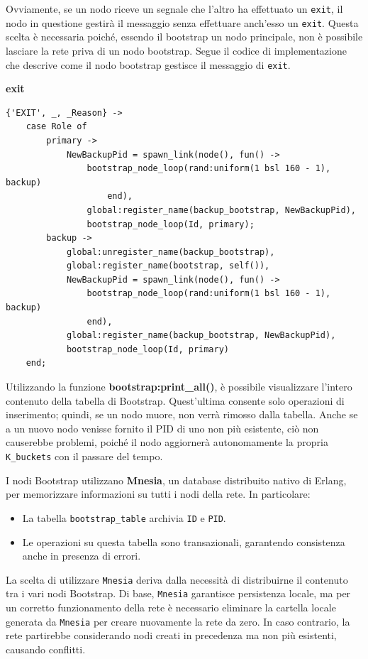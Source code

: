 \documentclass{article}
\begin{document}
Ovviamente, se un nodo riceve un segnale che l'altro ha effettuato un \texttt{exit}, il nodo in questione gestirà il messaggio senza effettuare anch'esso un \texttt{exit}. Questa scelta è necessaria poiché, essendo il bootstrap un nodo principale, non è possibile lasciare la rete priva di un nodo bootstrap. Segue il codice di implementazione che descrive come il nodo bootstrap gestisce il messaggio di \texttt{exit}.

\textbf{exit}
\begin{lstlisting}
{'EXIT', _, _Reason} ->
    case Role of
        primary ->
            NewBackupPid = spawn_link(node(), fun() ->
                bootstrap_node_loop(rand:uniform(1 bsl 160 - 1), backup)
                    end),
                global:register_name(backup_bootstrap, NewBackupPid),
                bootstrap_node_loop(Id, primary);
        backup ->
            global:unregister_name(backup_bootstrap),
            global:register_name(bootstrap, self()),
            NewBackupPid = spawn_link(node(), fun() ->
                bootstrap_node_loop(rand:uniform(1 bsl 160 - 1), backup)
                end),
            global:register_name(backup_bootstrap, NewBackupPid),
            bootstrap_node_loop(Id, primary)
    end;
\end{lstlisting}

Utilizzando la funzione \textbf{bootstrap:print\_all()}, è possibile visualizzare l'intero contenuto della tabella di Bootstrap. Quest'ultima consente solo operazioni di inserimento; quindi, se un nodo muore, non verrà rimosso dalla tabella. Anche se a un nuovo nodo venisse fornito il PID di uno non più esistente, ciò non causerebbe problemi, poiché il nodo aggiornerà autonomamente la propria \texttt{K\_buckets} con il passare del tempo.

I nodi Bootstrap utilizzano \textbf{Mnesia}, un database distribuito nativo di Erlang, per memorizzare informazioni su tutti i nodi della rete. In particolare:
\begin{itemize}
    \item La tabella \texttt{bootstrap\_table} archivia \texttt{ID} e \texttt{PID}.
    \item Le operazioni su questa tabella sono transazionali, garantendo consistenza anche in presenza di errori.
\end{itemize}
La scelta di utilizzare \texttt{Mnesia} deriva dalla necessità di distribuirne il contenuto tra i vari nodi Bootstrap. Di base, \texttt{Mnesia} garantisce persistenza locale, ma per un corretto funzionamento della rete è necessario eliminare la cartella locale generata da \texttt{Mnesia} per creare nuovamente la rete da zero. In caso contrario, la rete partirebbe considerando nodi creati in precedenza ma non più esistenti, causando conflitti.
\end{document}
